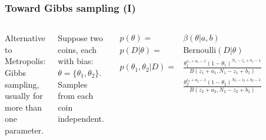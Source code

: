 \documentclass[usenames,dvipsnames,table]{beamer}
\begin{document}
\begin{frame}
\frametitle{Toward Gibbs sampling (I)}
\begin{columns}[c]
Alternative to Metropolis: Gibbs sampling, usually for more than one parameter.

\vspace{1em}
Suppose two coins, each with bias: $\theta = \{\theta_1, \theta_2\}$. Samples from each coin independent.

\begin{align*}
p(\theta)               =& \beta(\theta|a, b)\\
p(D|\theta)             =& \mathrm{Bernoulli}(D|\theta)\\
p(\theta_1, \theta_2|D) =
    &\frac{\theta_1^{z_1+a_1-1}(1-\theta_1)^{N_1-z_1+b_1-1}}
       {B(z_1+a_1, N_1-z_1+b_1)}\\
    &\frac{\theta_2^{z_2+a_2-1}(1-\theta_2)^{N_2-z_2+b_2-1}}
       {B(z_2+a_2, N_2-z_2+b_2)}
\end{align*}

\begin{figure}
\centering
\includegraphics[height=0.8\textheight]{img/fig7_5}
\end{figure}
\end{columns}
\end{frame}
\end{document}
